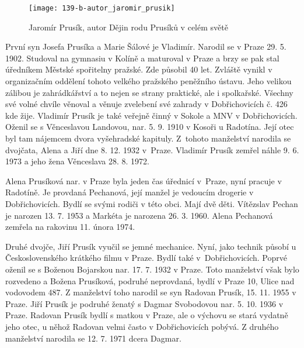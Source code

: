 \documentclass[../dejiny-rodu-prusiku.tex]{subfiles}
\begin{document}
\begin{figure}
\centering
\texttt{[image: 139-b-autor\_jaromir\_prusik]}
\caption{Jaromír Prusík, autor Dějin rodu Prusíků v celém světě}
\label{fig:139-b-autor_jaromir_prusik}
\end{figure}

První syn Josefa Prusíka a Marie Šálové je Vladimír. Narodil se v Praze 29. 5. 1902. Studoval na gymnasiu v Kolíně a maturoval v Praze a brzy se pak stal úřed­níkem Městské spořitelny pražské. Zde působil 40 let. Zvláště vynikl v organizačním oddělení tohoto velkého pražského peněžního ústavu. Jeho velikou zálibou je zahrádkářství a to nejen se strany praktické, ale i spolkařské. Všechny své volné chvíle věnoval a věnuje zvele­bení své zahrady v Dobřichovicích č. 426 kde žije. Vladimír Prusík je také veřejně činný v Sokole a MNV v Dobřichovicích. Oženil se s Věnceslavou Landovou, nar. 5. 9. 1910 v Kosoři u Radotína. Její otec byl tam nájem­cem dvora vyšehradské kapituly. Z tohoto manželství narodila se dvojčata, Alena a Jiří dne 8. 12. 1932 v Praze. Vladimír Prusík zemřel náhle 9. 6. 1973 a jeho žena Věnceslava 28. 8. 1972.

Alena Prusíková nar. v Praze byla jeden čas úřednicí v Praze, nyní pracuje v Radotíně. Je provdaná Pechanová, její manžel je vedoucím drogerie v Dobřichovicích. Bydlí se svými rodiči v této obci. Mají dvě děti. Vítězslav Pechan je narozen 13. 7. 1953 a Markéta je narozena 26. 3. 1960. Alena Pechanová zemřela na rakovinu 11. února 1974.

Druhé dvojče, Jiří Prusík vyučil se jemné mechanice. Nyní, jako technik působí u Československého krátkého filmu v Praze. Bydlí také v Dobřichovicích. Poprvé oženil se s Boženou Bojarskou nar. 17. 7. 1932 v Praze. Toto manželství však bylo rozvedeno a Božena Prusíková, podruhé neprovdaná, bydlí v Praze 10, Ulice nad vodovo­dem 487. Z manželství toho narodil se syn Radovan Prusík, 15. 11. 1955 v Praze. Jiří Prusík je podruhé ženatý s Dagmar Svobodovou nar. 5. 10. 1936 v Praze. Radovan Pru­sík bydlí s matkou v Praze, ale o výchovu se stará vydatně jeho otec, u něhož Radovan velmi často v Dobřichovicích pobývá. Z druhého manželství narodila se 12. 7. 1971 dcera Dagmar.
\end{document}
